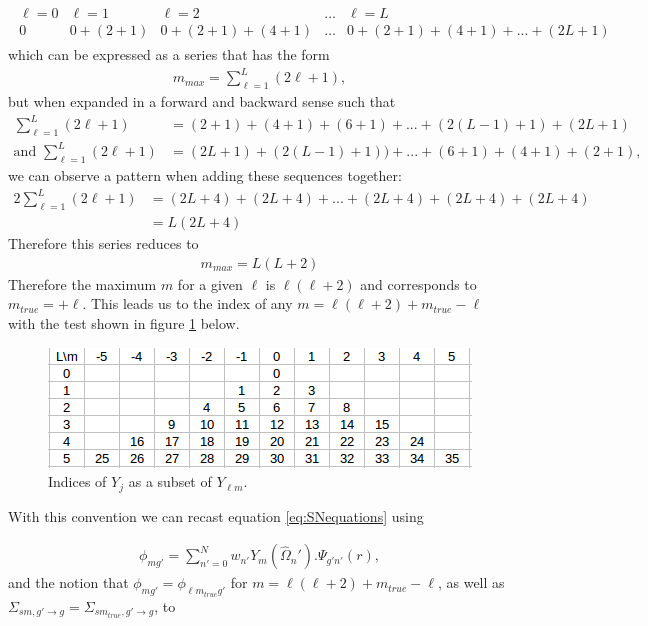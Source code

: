 \documentclass[11pt,letterpaper,titlepage]{article}
\numberwithin{equation}{section}
\begin{document}
\begin{align}
\begin{matrix}
\ell=0       &\ell=1      &\ell=2                      &\hdots     &\ell=L \\
0            &0+(2+1) & 0+(2 +1)+(4+1)     &\hdots     &0+(2 +1)+(4+1) +...+(2L+1)
\end{matrix}
\end{align}
\newline
\noindent which can be expressed as a series that has the form 
\begin{align}
m_{max}=\sum_{\ell=1}^L (2\ell+1),
\end{align}
but when expanded in a forward and backward sense such that 
\begin{align*}
\sum_{\ell=1}^L (2\ell+1)  &= (2+1)+(4+1)+(6+1)+...+(2(L-1)+1)+(2L+1) \\
\text{and   }
\sum_{\ell=1}^L (2\ell+1)  &= (2L+1)+(2(L-1)+1))+...+(6+1)+(4+1)+(2+1), 
\end{align*}
\noindent we can observe a pattern when adding these sequences together:
\begin{align*}
2\sum_{\ell=1}^L (2\ell+1) &= (2L+4)+(2L+4)+...+(2L+4)+(2L+4)+(2L+4) \\
&= L(2L+4) 
\end{align*}
\noindent
Therefore this series reduces to
\begin{align}
m_{max} = L(L+2)
\end{align}
\newline
\noindent Therefore the maximum $m$ for a given $\ell$ is $\ell(\ell+2)$ and corresponds to $m_{true}=+\ell$. This leads us to the index of any $m=\ell(\ell+2)+m_{true}-\ell$ with the test shown in figure \ref{fig:indices} below.


\begin{figure}[h]
    \centering
    \includegraphics[width=0.5\linewidth]{jindex.png}
    \caption{Indices of $Y_j$ as a subset of $Y_{\ell m}$.}
    \label{fig:indices}
\end{figure}

\noindent With this convention we can recast equation \ref{eq:SNequations} using 

\begin{align*}
\phi_{mg'} = \sum_{n'=0}^{N}
w_{n'}
Y_{m}(\hat{\Omega}_n')
. \Psi_{g'n'}(r),
\end{align*}
and the notion that $\phi_{mg'} = \phi_{\ell m_{true}g'}$ for $m=\ell(\ell+2)+m_{true}-\ell$, as well as $\Sigma_{sm,g'{\to}g} = \Sigma_{sm_{true},g'{\to}g}$, to
\end{document}
